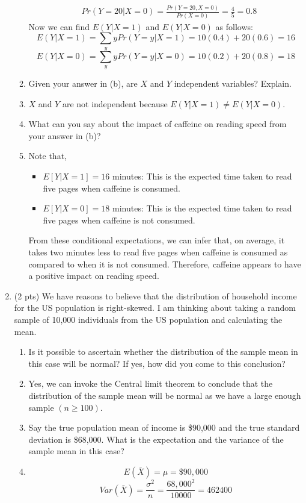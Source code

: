 \documentclass{./../../Latex/handout}
\begin{document}
\begin{enumerate}
\begin{enumerate}
\begin{align*}
  & Pr(Y=20| X= 0) = \frac{Pr(Y=20, X= 0)}{Pr(X=0)} = \frac{4}{5} =0.8 
\end{align*}  
Now we can find $E(Y|X=1)$ and $E(Y|X=0)$ as follows:
$$E(Y|X=1) = \sum_y y Pr(Y=y|X=1) = 10(0.4) + 20(0.6) = 16 $$ 
$$E(Y|X=0) = \sum_y y Pr(Y=y|X=0) = 10(0.2) + 20(0.8) = 18 $$
\item Given your answer in (b), are $X$ and $Y$ independent variables? Explain. 
\item[]  $X$ and $Y$ are not independent because $E(Y|X=1)\neq E(Y|X=0)$.
\item What can you say about the impact of caffeine on reading speed from your answer in (b)? 
\item[] Note that, 
\begin{itemize}
    \item \( E[Y | X = 1] = 16 \) minutes: This is the expected time taken to read five pages when caffeine is consumed.
    \item \( E[Y | X = 0] = 18 \) minutes: This is the expected time taken to read five pages when caffeine is not consumed.
\end{itemize}

From these conditional expectations, we can infer that, on average, it takes two minutes less to read five pages when caffeine is consumed as compared to when it is not consumed. Therefore, caffeine appears to have a positive impact on reading speed.\\
\end{enumerate}

\item (2 pts) We have reasons to believe that the distribution of household income
for the US population is right-skewed. I am thinking about
taking a random sample of 10,000 individuals from the US population
and calculating the mean. 
\begin{enumerate}
  \item Is it possible to ascertain whether the distribution of the sample mean in this case will be normal? If yes, how did you come to this conclusion?
  \item[] Yes, we can invoke the Central limit theorem to conclude that the distribution of the sample mean will be normal as we have a large enough sample $(n \geq 100)$. 
\item Say the true population mean of income is \$90,000 and the true standard
deviation is \$68,000. What is the expectation and the variance of the sample mean in this case? 
\item[] $$ E(\bar{X}) = \mu = \$90,000 $$
$$ Var(\bar{X}) = \frac{\sigma^2}{n} = \frac{68,000^2}{10000} =  462400 $$ \\
\end{enumerate}


\end{enumerate}
\end{document}
